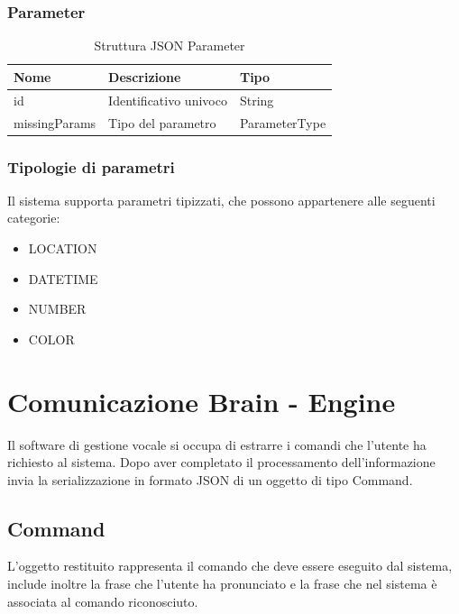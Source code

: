 \documentclass[twoside]{supsistudent}
\begin{document}
\subsection{Parameter}
\begin{table}[H]
\centering
\caption{Struttura JSON Parameter}
\label{Struttura JSON Parameter}
\begin{tabular}{@{}|l|l|l|@{}}
\toprule
Nome & Descrizione            & Tipo          \\ \midrule
id   & Identificativo univoco & String        \\ \midrule
missingParams & Tipo del parametro     & ParameterType \\ \bottomrule
\end{tabular}
\end{table}

\subsection{Tipologie di parametri}
Il sistema supporta parametri tipizzati, che possono appartenere alle seguenti categorie:
\begin{itemize}
	\item LOCATION
	\item DATETIME
	\item NUMBER
	\item COLOR
\end{itemize}

\chapter{Comunicazione Brain - Engine }
Il software di gestione vocale si occupa di estrarre i comandi che l'utente ha richiesto al sistema. Dopo aver completato il processamento dell'informazione invia la serializzazione in formato JSON di un oggetto di tipo Command.
\section{Command}
L'oggetto restituito rappresenta il comando che deve essere eseguito dal sistema, include inoltre la frase che l'utente ha pronunciato e la frase che nel sistema è associata al comando riconosciuto.
\end{document}
